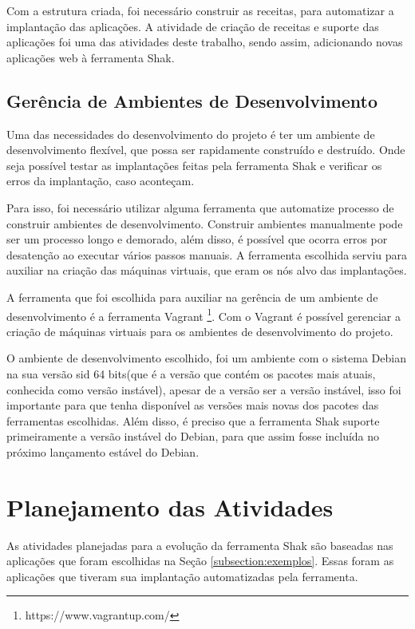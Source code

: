 Com a estrutura criada, foi necessário construir as receitas, para automatizar
a implantação das aplicações. A atividade de 
criação de receitas e suporte das aplicações foi uma das atividades 
deste trabalho, sendo assim, adicionando novas aplicações web à ferramenta Shak.

\subsection{Gerência de Ambientes de Desenvolvimento}

Uma das necessidades do desenvolvimento do projeto é ter um ambiente de desenvolvimento
flexível, que possa ser rapidamente construído e destruído. Onde seja possível 
testar as implantações feitas pela ferramenta Shak e verificar os erros da implantação, caso 
aconteçam. 

Para isso, foi necessário utilizar alguma ferramenta que automatize processo de 
construir ambientes de desenvolvimento. Construir ambientes manualmente pode
ser um processo longo e demorado, além disso, é possível que ocorra erros por
desatenção ao executar vários passos manuais. A ferramenta escolhida serviu para
auxiliar na criação das máquinas virtuais, que eram os nós alvo 
das implantações.

A ferramenta que foi escolhida para auxiliar na gerência de um ambiente de desenvolvimento é
a ferramenta Vagrant \footnote{https://www.vagrantup.com/}. Com o Vagrant é 
possível gerenciar a criação de máquinas
virtuais para os ambientes de desenvolvimento do projeto.

O ambiente de desenvolvimento escolhido, foi um ambiente com o sistema Debian na sua versão
sid 64 bits(que é a versão que contém os pacotes mais atuais, conhecida como versão instável),
apesar de a versão ser a versão instável, isso foi importante para que tenha disponível 
as versões mais novas dos pacotes das ferramentas escolhidas. Além disso, é preciso que a ferramenta Shak suporte primeiramente a versão instável do Debian, para que assim 
fosse incluída no próximo lançamento estável do Debian.

\section{Planejamento das Atividades}

As atividades planejadas para a evolução da ferramenta Shak são baseadas nas 
aplicações que foram escolhidas na Seção
\ref{subsection:exemplos}. Essas foram as aplicações que tiveram
sua implantação automatizadas pela ferramenta. 

